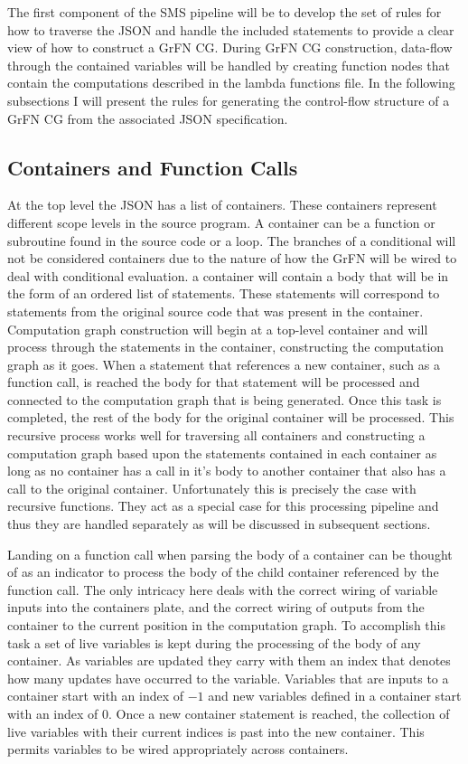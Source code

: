 The first component of the SMS pipeline will be to develop the set of rules for how to traverse the JSON and handle the included statements to provide a clear view of how to construct a GrFN CG.
During GrFN CG construction, data-flow through the contained variables will be handled by creating function nodes that contain the computations described in the lambda functions file.
In the following subsections I will present the rules for generating the control-flow structure of a GrFN CG from the associated JSON specification.

\subsection{Containers and Function Calls\label{sec:containers}}
At the top level the JSON has a list of containers. These containers represent different scope levels in the source program. A container can be a function or subroutine found in the source code or a loop. The branches of a conditional will not be considered containers due to the nature of how the GrFN will be wired to deal with conditional evaluation. a container will contain a body that will be in the form of an ordered list of statements. These statements will correspond to statements from the original source code that was present in the container. Computation graph construction will begin at a top-level container and will process through the statements in the container, constructing the computation graph as it goes. When a statement that references a new container, such as a function call, is reached the body for that statement will be processed and connected to the computation graph that is being generated. Once this task is completed, the rest of the body for the original container will be processed. This recursive process works well for traversing all containers and constructing a computation graph based upon the statements contained in each container as long as no container has a call in it's body to another container that also has a call to the original container. Unfortunately this is precisely the case with recursive functions. They act as a special case for this processing pipeline and thus they are handled separately as will be discussed in subsequent sections.

Landing on a function call when parsing the body of a container can be thought of as an indicator to process the body of the child container referenced by the function call.
The only intricacy here deals with the correct wiring of variable inputs into the containers plate, and the correct wiring of outputs from the container to the current position in the computation graph.
To accomplish this task a set of live variables is kept during the processing of the body of any container.
As variables are updated they carry with them an index that denotes how many updates have occurred to the variable.
Variables that are inputs to a container start with an index of $-1$ and new variables defined in a container start with an index of $0$.
Once a new container statement is reached, the collection of live variables with their current indices is past into the new container.
This permits variables to be wired appropriately across containers.

